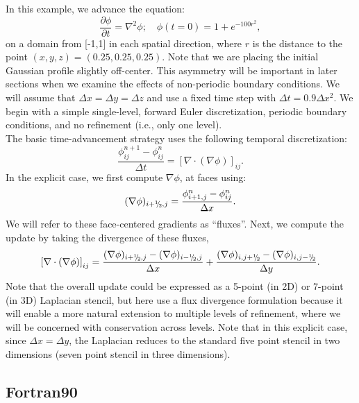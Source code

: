 In this example, we advance the equation:
\begin{equation}
\frac{\partial\phi}{\partial t} = \nabla^2 \phi; \quad \phi(t=0) = 1 + e^{-100r^2},
\end{equation}
on a domain from [-1,1] in each spatial direction, where $r$ is the distance
to the point $(x,y,z) = (0.25,0.25,0.25)$.  Note that we are placing the
initial Gaussian profile slightly off-center.  This asymmetry will be important
in later sections when we examine the effects of non-periodic boundary conditions.
We will assume that $\Delta x = \Delta y = \Delta z$ and use a fixed
time step with $\Delta t = 0.9\Delta x^2$.  We begin with a simple 
single-level, forward Euler discretization, periodic boundary conditions,
and no refinement (i.e., only one level).\\

The basic time-advancement strategy uses the following temporal discretization:
\begin{equation}
\frac{\phi_{ij}^{n+1} - \phi_{ij}^n}{\Delta t} = \left[\nabla\cdot(\nabla\phi)\right]_{ij}.
\end{equation}
In the explicit case, we first compute $\nabla\phi$, at faces using:
\begin{equation}
(\nabla\phi)_{i+\myhalf,j} = \frac{\phi_{i+1,j}^n-\phi_{ij}^n}{\Delta x}.
\end{equation}
We will refer to these face-centered gradients as ``fluxes''.
Next, we compute the update by taking the divergence of these fluxes,
\begin{equation}
\left[\nabla\cdot(\nabla\phi)\right]_{ij} = \frac{(\nabla\phi)_{i+\myhalf,j}-(\nabla\phi)_{i-\myhalf,j}}{\Delta x} + \frac{(\nabla\phi)_{i,j+\myhalf}-(\nabla\phi)_{i,j-\myhalf}}{\Delta y}.
\end{equation}
Note that the overall update could be expressed as a 5-point (in 2D) or 7-point (in 3D) 
Laplacian stencil,
but here use a flux divergence formulation because it will enable a more natural 
extension to multiple levels of refinement, where we will be concerned with
conservation across levels.  Note that in this explicit case, since $\Delta x = \Delta y$, 
the Laplacian reduces to the standard five point stencil in two dimensions
(seven point stencil in three dimensions).\\

\subsection{Fortran90}

